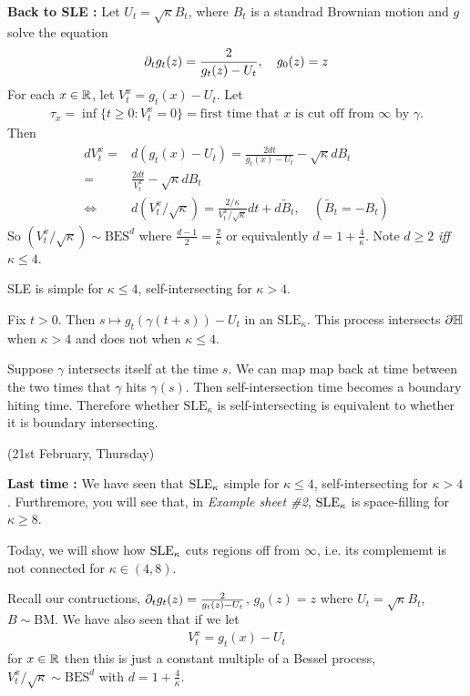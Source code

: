 \documentclass[12pt,a4paper]{article}
\newenvironment{proof}
{\begin{changemargin}{0.5cm}{0.5cm} 
	}%
	{\end{changemargin}
}
\newenvironment{p}
{\begin{proof} 
	}%
	{\end{proof}
}
\begin{document}
\textbf{Back to SLE :} Let $U_t = \sqrt{\kappa} B_t$, where $B_t$ is a standrad Brownian motion and $g$ solve the equation
\begin{align*}
\partial_t g_t (z) = \frac{2}{g_t(z) - U_t}, \quad g_0(z) =z
\end{align*}
For each $x\in \mathbb{R}$, let $V_t^x = g_t(x) - U_t$. Let
\begin{align*}
\tau_x = \inf \{ t\geq 0: V_t^x =0\}=\text{first time that } x\text{ is cut off from }\infty \text{ by } \gamma.
\end{align*}
Then
\begin{align*}
dV_t^x =& d(g_t(x) - U_t) = \frac{2dt}{g_t(x) - U_t} - \sqrt{\kappa} dB_t \\
=& \frac{2dt}{V_t^x} - \sqrt{\kappa} dB_t \\
\Leftrightarrow \quad & d(V_t^x / \sqrt{\kappa}) = \frac{2/ \kappa}{V_t^x / \sqrt{\kappa}} dt + d\tilde{B}_t, \quad (\tilde{B}_t = -B_t)
\end{align*}
So $(V_t^x / \sqrt{\kappa}) \sim \text{BES}^d$ where $\frac{d-1}{2} = \frac{2}{\kappa}$ or equivalently $d= 1+ \frac{4}{\kappa}$. Note $d\geq 2$ \emph{iff} $\kappa \leq 4$.
\s

\prop SLE is simple for $\kappa \leq 4$, self-intersecting for $\kappa>4$.
\begin{p}
\pf Fix $t>0$. Then $s\mapsto g_t(\gamma(t+s)) - U_t$ in an $\text{SLE}_{\kappa}$. This process intersects $\partial \mathbb{H}$ when $\kappa >4$ and does not when $\kappa \leq 4$.

\quad Suppose $\gamma$ intersects itself at the time $s$. We can map map back at time between the two times that $\gamma$ hits $\gamma(s)$. Then self-intersection time becomes a boundary hiting time. Therefore whether $\text{SLE}_{\kappa}$ is self-intersecting is equivalent to whether it is boundary intersecting.

\eop
\end{p}
\s

\newday

(21st February, Thursday)
\s

\textbf{Last time :} We have seen that $\text{SLE}_{\kappa}$ simple for $\kappa\leq 4$, self-intersecting for $\kappa>4$. Furthremore, you will see that, in \emph{Example sheet \#2}, $\text{SLE}_{\kappa}$ is space-filling for $\kappa\geq 8$.
\s

Today, we will show how $\text{SLE}_{\kappa}$ cuts regions off from $\infty$, i.e. its complememt is not connected for $\kappa \in (4,8)$.
\s

Recall our contructions, $\partial_{t} g_t(z) = \frac{2}{g_t(z) - U_t}$, $g_0(z) =z$ where $U_t = \sqrt{\kappa} B_t$, $B\sim \text{BM}$. We have also seen that if we let
\begin{align*}
V_t^x = g_t(x) - U_t
\end{align*}
for $x\in \mathbb{R}$ then this is just a constant multiple of a Bessel process, $V_t^x /\sqrt{\kappa} \sim \text{BES}^d$ with $d= 1+ \frac{4}{\kappa}$.
\s
\end{document}
